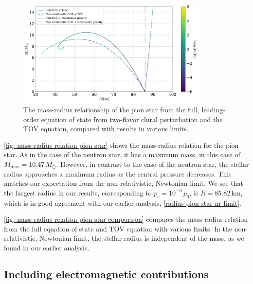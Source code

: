 \begin{figure}[!h]
    \centering
    \includegraphics[width=0.85\textwidth]{../scripts/figurer/pion_star/mass_radius_comparison.pdf}
    \caption{
        The mass-radius relationship of the pion star from the full, leading-order equation of state from two-flavor chiral perturbation and the TOV equation, compared with results in various limits.
        }
        \label{fig: mass-radius relation pion star comparison}
\end{figure}


\autoref{fig: mass-radius relation pion star} shows the mass-radius relation for the pion star.
As in the case of the neutron star, it has a maximum mass, in this case of $M_\text{max} = 10.47\, M_\odot$.
However, in contrast to the case of the neutron star, the stellar radius approaches a maximum radius as the central pressure decreases.
This matches our expectation from the non-relativistic, Newtonian limit.
We see that the largest radius in our results, corresponding to  $p_c = 10^{-6} \, p_0$, is $R = 85.82 \, \text{km}$, which is in good agreement with our earlier analysis, \autoref{radius pion star nr limit}.

\autoref{fig: mass-radius relation pion star comparison} compares the mass-radius relation from the full equation of state and TOV equation with various limits.
In the non-relativistic, Newtonian limit, the stellar radius is independent of the mass, as we found in our earlier analysis.




\FloatBarrier
\subsection{Including electromagnetic contributions}

